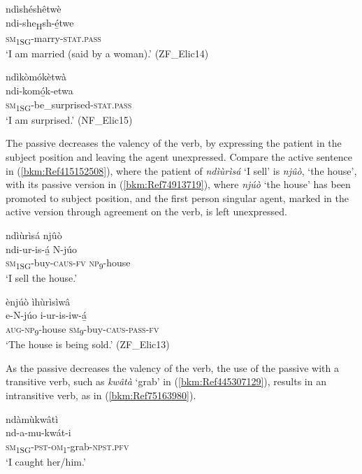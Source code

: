 \ea
\label{bkm:Ref99025779}
\glll ndìshéshêtwè\\
ndi-she\textsubscript{H}sh-é̲twe\\
\textsc{sm}\textsubscript{1SG}-marry-\textsc{stat}.\textsc{pass}\\
\glt ‘I am married (said by a woman).’ (ZF\_Elic14)
\z

\ea
\label{bkm:Ref99025793}
\glll ndìkòmókètwà\\
ndi-komó̲k-etwa\\
\textsc{sm}\textsubscript{1SG}-be\_surprised-\textsc{stat}.\textsc{pass}\\
\glt ‘I am surprised.’ (NF\_Elic15)
\z

The passive decreases the valency of the verb, by expressing the patient in the subject position and leaving the agent unexpressed. Compare the active sentence in (\ref{bkm:Ref415152508}), where the patient of \textit{ndìùrìsá} ‘I sell’ is \textit{njûò}, ‘the house’, with its passive version in (\ref{bkm:Ref74913719}), where \textit{njúò} ‘the house’ has been promoted to subject position, and the first person singular agent, marked in the active version through agreement on the verb, is left unexpressed.

\ea
\label{bkm:Ref415152508}
ndìùrìsá njûò\\
\gll ndi-ur-is-á̲    N-júo\\
\textsc{sm}\textsubscript{1SG}-buy-\textsc{caus}-\textsc{fv}  \textsc{np}\textsubscript{9}-house\\
\glt ‘I sell the house.’
\z

\ea
\label{bkm:Ref74913719}
ènjúò ìhùrìsìwâ\\
\gll e-N-júo    i-ur-is-iw-á̲\\
\textsc{aug}-\textsc{np}\textsubscript{9}-house  \textsc{sm}\textsubscript{9}-buy-\textsc{caus}-\textsc{pass}-\textsc{fv}\\
\glt ‘The house is being sold.’ (ZF\_Elic13)
\z

As the passive decreases the valency of the verb, the use of the passive with a transitive verb, such as \textit{kwâtà} ‘grab’ in (\ref{bkm:Ref445307129}), results in an intransitive verb, as in (\ref{bkm:Ref75163980}).

\ea
\label{bkm:Ref445307129}
\glll ndàmùkwâtì\\
nd-a-mu-kwát-i\\
\textsc{sm}\textsubscript{1SG}-\textsc{pst}-\textsc{om}\textsubscript{1}-grab-\textsc{npst}.\textsc{pfv}\\
\glt ‘I caught her/him.’
\z

